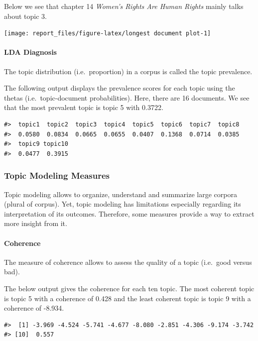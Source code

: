 \documentclass[
]{article}
\begin{document}
Below we see that chapter 14 \emph{Women's Rights Are Human Rights}
mainly talks about topic 3.

\begin{center}\texttt{[image: report\_files/figure-latex/longest document plot-1]} \end{center}

\hypertarget{lda-diagnosis}{%
\paragraph{LDA Diagnosis}\label{lda-diagnosis}}

The topic distribution (i.e.~proportion) in a corpus is called the topic
prevalence.

The following output displays the prevalence scores for each topic using
the thetas (i.e.~topic-document probabilities). Here, there are 16
documents. We see that the most prevalent topic is topic 5 with 0.3722.

\begin{verbatim}
#>  topic1  topic2  topic3  topic4  topic5  topic6  topic7  topic8 
#>  0.0580  0.0834  0.0665  0.0655  0.0407  0.1368  0.0714  0.0385 
#>  topic9 topic10 
#>  0.0477  0.3915
\end{verbatim}

\hypertarget{topic-modeling-measures}{%
\subsubsection{Topic Modeling Measures}\label{topic-modeling-measures}}

Topic modeling allows to organize, understand and summarize large
corpora (plural of corpus). Yet, topic modeling has limitations
especially regarding its interpretation of its outcomes. Therefore, some
measures provide a way to extract more insight from it.

\hypertarget{coherence}{%
\paragraph{Coherence}\label{coherence}}

The measure of coherence allows to assess the quality of a topic
(i.e.~good versus bad).

The below output gives the coherence for each ten topic. The most
coherent topic is topic 5 with a coherence of 0.428 and the least
coherent topic is topic 9 with a coherence of -8.934.

\begin{verbatim}
#>  [1] -3.969 -4.524 -5.741 -4.677 -8.080 -2.851 -4.306 -9.174 -3.742
#> [10]  0.557
\end{verbatim}
\end{document}
